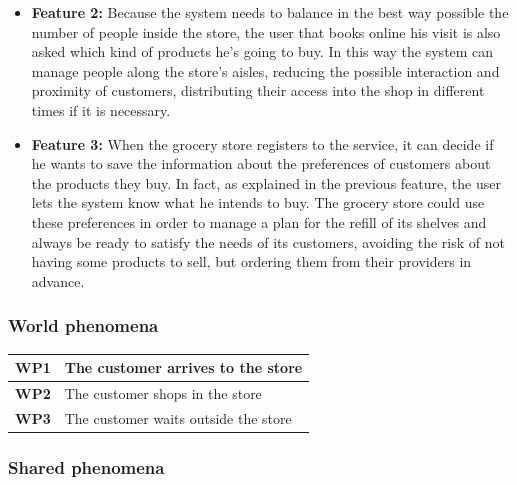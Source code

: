 \documentclass[]{article}
\begin{document}
\begin{paragraph}
\begin{itemize}
			\item  \textbf{Feature 2:}
				Because the system needs to balance in the best way possible the number of people inside the store, the user that books online his visit is also asked which kind of products he’s going to buy. In this way the system can manage people along the store’s aisles, reducing the possible interaction and proximity of customers, distributing their access into the shop in different times if it is necessary.  \\

			\item  \textbf{Feature 3:}
				When the grocery store registers to the service, it can decide if he wants to save the information about the preferences of customers about the products they buy. In fact, as explained in the previous feature, the user lets the system know what he intends to buy. The grocery store could use these preferences in order to manage a plan for the refill of its shelves and always be ready to satisfy the needs of  its customers, avoiding the risk of not having some products to sell, but ordering them from their providers in advance.

			\end{itemize}
			
	
		\end{paragraph}
	
		\subsubsection{World phenomena}

			\begin{tabular}{|c|l|}
				\hline
				\rowcolor[HTML]{DCDCDC} 
				\textbf{WP1} & The customer arrives to the store \\ \hline
				\textbf{WP2} & The customer shops in the store \\ \hline
				\rowcolor[HTML]{DCDCDC} 
				\textbf{WP3} & The customer waits outside the store \\ \hline
			\end{tabular}
			
		\subsubsection{Shared phenomena}
		
\end{document}

